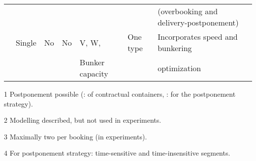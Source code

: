 {\begin{landscape}
\begin{table}[width=0.95\linewidth,cols=7,pos=p]
\begin{footnotesize}
\begin{threeparttable}
\begin{tabular*}{\tblwidth}{@{} *{7}{L} @{}}
					&						&			&			& 				&										& (overbooking and delivery-postponement)\\
\citet{Wang19a}		& Single 				& No 		& No		& V, W,			& One type								& Incorporates speed and bunkering \\
					&						&			&			& Bunker capacity& 										& optimization \\
\bottomrule
\end{tabular*}
\begin{tablenotes}\scriptsize
\item[1] Postponement possible (\citet{Lee07}: of contractual containers, \citet{Wang19b}: for the postponement strategy).
\item[2] Modelling described, but not used in experiments. %
\item[3] Maximally two per booking (in experiments).
\item[4] For postponement strategy: time-sensitive and time-insensitive segments.
\end{tablenotes}
\end{threeparttable}
\end{footnotesize}
\end{table}
\end{landscape}
}

